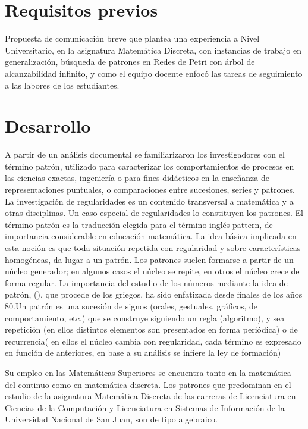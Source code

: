 \documentclass[oneside,spanish]{amsart}
\numberwithin{equation}{section}
\theoremstyle{definition}
\begin{document}
\section{Requisitos previos}

Propuesta de comunicación breve que plantea una experiencia a Nivel Universitario, en la asignatura Matemática Discreta, con instancias de trabajo en generalización, búsqueda de patrones en Redes de Petri con árbol de alcanzabilidad infinito, y como el equipo docente enfocó las tareas de seguimiento a las labores de los estudiantes.

\section{Desarrollo}

A partir de un análisis documental se familiarizaron los investigadores con el término patrón, utilizado para caracterizar los comportamientos de procesos en las ciencias exactas, ingeniería o para fines didácticos en la enseñanza de representaciones puntuales, o comparaciones entre sucesiones, series y patrones. La investigación de regularidades es un contenido transversal a matemática y a otras disciplinas. Un caso especial de regularidades lo constituyen los patrones. El término patrón es la traducción elegida para el término inglés pattern, de importancia considerable en educación matemática. La idea básica implicada en esta noción es que toda situación repetida con regularidad y sobre características homogéneas, da lugar a un patrón. Los patrones suelen formarse a partir de un núcleo generador; en algunos casos el núcleo se repite, en otros el núcleo crece de forma regular. La importancia del estudio de los números mediante la idea de patrón, (\citet{castro94}), que procede de los griegos, ha sido enfatizada desde finales de los años 80.Un patrón es una sucesión de signos (orales, gestuales, gráficos, de comportamiento, etc.) que se construye siguiendo un regla (algoritmo), y sea repetición (en ellos distintos elementos son presentados en forma periódica) o de recurrencia( en ellos el núcleo cambia con regularidad, cada término es expresado en función de anteriores, en base a su análisis se infiere la ley de formación)

Su empleo en las Matemáticas Superiores se encuentra tanto en la matemática del continuo como en matemática discreta. Los patrones que predominan en el estudio de la asignatura Matemática Discreta de las carreras de Licenciatura en Ciencias de la Computación y Licenciatura en Sistemas de Información de la Universidad Nacional de San Juan, son de tipo algebraico.
\end{document}
